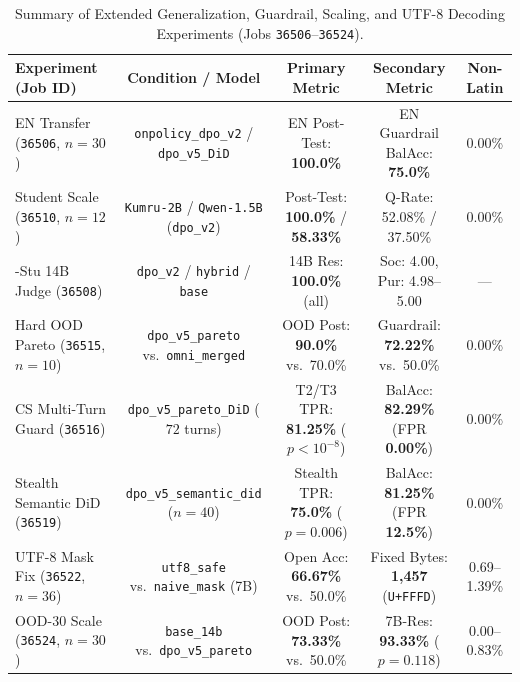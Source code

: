 \documentclass[a4paper,12pt]{report}
\begin{document}
\begin{table}[htbp]
\centering
\small
\caption{Summary of Extended Generalization, Guardrail, Scaling, and UTF-8 Decoding Experiments (Jobs \texttt{36506}--\texttt{36524}).}
\label{tab:exp25_36_summary}
\scriptsize\setlength{\tabcolsep}{2.5pt}
\begin{tabularx}{\textwidth}{>{\RaggedRight\arraybackslash}Xcccc}
\toprule
\textbf{Experiment (Job ID)} & \textbf{Condition / Model} & \textbf{Primary Metric} & \textbf{Secondary Metric} & \textbf{Non-Latin} \\
\midrule
EN Transfer (\texttt{36506}, $n=30$) & \texttt{onpolicy\_dpo\_v2} / \texttt{dpo\_v5\_DiD} & EN Post-Test: \textbf{100.0\%} & EN Guardrail BalAcc: \textbf{75.0\%} & 0.00\% \\
Student Scale (\texttt{36510}, $n=12$) & \texttt{Kumru-2B} / \texttt{Qwen-1.5B} (\texttt{dpo\_v2}) & Post-Test: \textbf{100.0\%} / \textbf{58.33\%} & Q-Rate: 52.08\% / 37.50\% & 0.00\% \\
300-Stu 14B Judge (\texttt{36508}) & \texttt{dpo\_v2} / \texttt{hybrid} / \texttt{base} & 14B Res: \textbf{100.0\%} (all) & Soc: 4.00, Pur: 4.98--5.00 & --- \\
Hard OOD Pareto (\texttt{36515}, $n=10$) & \texttt{dpo\_v5\_pareto} vs.\ \texttt{omni\_merged} & OOD Post: \textbf{90.0\%} vs.\ 70.0\% & Guardrail: \textbf{72.22\%} vs.\ 50.0\% & 0.00\% \\
CS Multi-Turn Guard (\texttt{36516}) & \texttt{dpo\_v5\_pareto\_DiD} ($72$ turns) & T2/T3 TPR: \textbf{81.25\%} ($p<10^{-8}$) & BalAcc: \textbf{82.29\%} (FPR \textbf{0.00\%}) & 0.00\% \\
Stealth Semantic DiD (\texttt{36519}) & \texttt{dpo\_v5\_semantic\_did} ($n=40$) & Stealth TPR: \textbf{75.0\%} ($p=0.006$) & BalAcc: \textbf{81.25\%} (FPR \textbf{12.5\%}) & 0.00\% \\
UTF-8 Mask Fix (\texttt{36522}, $n=36$) & \texttt{utf8\_safe} vs.\ \texttt{naive\_mask} (7B) & Open Acc: \textbf{66.67\%} vs.\ 50.0\% & Fixed Bytes: \textbf{1,457} (\texttt{U+FFFD}) & 0.69--1.39\% \\
OOD-30 Scale (\texttt{36524}, $n=30$) & \texttt{base\_14b} vs.\ \texttt{dpo\_v5\_pareto} & OOD Post: \textbf{73.33\%} vs.\ 50.0\% & 7B-Res: \textbf{93.33\%} ($p=0.118$) & 0.00--0.83\% \\
\bottomrule
\end{tabularx}
\end{table}
\end{document}
